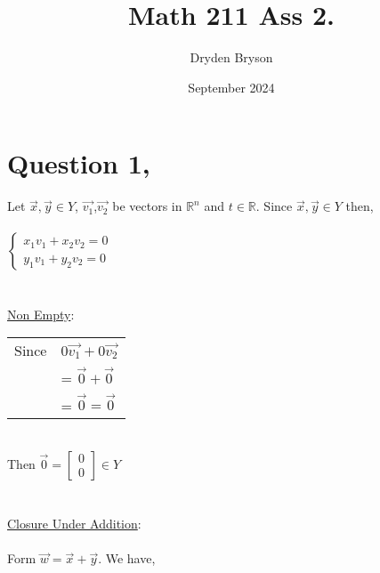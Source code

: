 \documentclass{article}
\title{Math 211 Ass 2.}
\author{Dryden Bryson}
\date{September 2024}
\begin{document}
\maketitle
\newpage
\section*{Question 1,}
Let $\vec{x},\vec{y}\in Y$, $\vec{v_1}$,$\vec{v_2}$ be vectors in $\mathbb{R}^n$ and $t\in \mathbb{R}$. Since $\vec{x},\vec{y}\in Y$ then,\\\\
$\begin{cases}
    x_1v_1+x_2v_2=0\\
    y_1v_1+y_2v_2=0
\end{cases}$
 \\\\\\\underline{Non Empty}:\\


 
 \begin{table}[htp]
     \begin{tabular}{ll}
          Since &  $0\vec{v_1}+0\vec{v_2}$\\
          &  = $\vec{0}+\vec{0}$\\
          &  = $\vec{0} = \vec{0}$\\
     \end{tabular}
 \end{table} \\
 Then $\vec{0}=\begin{bmatrix}
     0\\0
 \end{bmatrix}\in Y$
 \\\\\\
 \underline{Closure Under Addition}:\\\\
 Form $\vec{w}=\vec{x}+\vec{y}$. We have,
 
\end{document}
